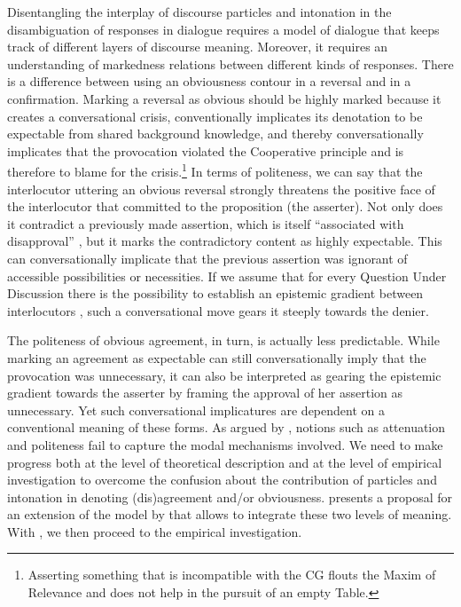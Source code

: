 \pagebreak\largerpage Disentangling the interplay of discourse particles and intonation in the disambiguation of responses in dialogue requires a model of dialogue that keeps track of different layers of discourse meaning. Moreover, it requires an understanding of markedness relations between different kinds of responses. There is a difference between using an obviousness contour in a reversal and in a confirmation. Marking a reversal as obvious should be highly marked because it creates a conversational crisis, conventionally implicates its denotation to be expectable from shared background knowledge, and thereby conversationally implicates that the provocation violated the Cooperative principle \citep{Grice.1975} and is therefore to blame for the crisis.\footnote{Asserting something that is incompatible with the \ac{CG} flouts the Maxim of Relevance and does not help in the pursuit of an empty Table.} In terms of politeness, we can say that the interlocutor uttering an obvious reversal strongly threatens the positive face of the interlocutor that committed to the proposition (the asserter). Not only does it contradict a previously made assertion, which is itself ``associated with disapproval'' \citep[66]{BrownLevinson.1988}, but it marks the contradictory content as highly expectable. This can conversationally implicate that the previous assertion was ignorant of accessible possibilities or necessities. If we assume that for every Question Under Discussion there is the possibility to establish an epistemic gradient between interlocutors \citep[32]{Heritage.2012epistemicengine}, such a conversational move gears it steeply towards the denier. 

The politeness of obvious agreement, in turn, is actually less predictable. While marking an agreement as expectable can still conversationally imply that the provocation was unnecessary, it can also be interpreted as gearing the epistemic gradient towards the asserter by framing the approval of her assertion as unnecessary. Yet such conversational implicatures are dependent on a conventional meaning of these forms. As argued by \citet[188--189]{Waltereit.2006}, notions such as attenuation and politeness fail to capture the modal mechanisms involved. We need to make progress both at the level of theoretical description and at the level of empirical investigation to overcome the confusion about the contribution of particles and intonation in denoting (dis)agreement and/or obviousness.  presents a proposal for an extension of the model by \citeauthor{FarkasBruce.2010} that allows to integrate these two levels of meaning. With , we then proceed to the empirical investigation.

